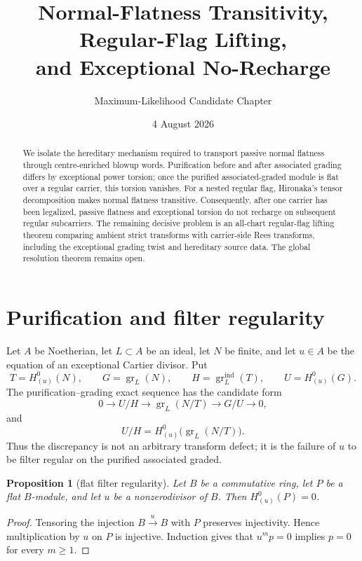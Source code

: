 \documentclass[11pt]{amsart}
\title{Normal-Flatness Transitivity, Regular-Flag Lifting,\\ and Exceptional No-Recharge}
\author{Maximum-Likelihood Candidate Chapter}
\date{4 August 2026}
\newtheorem{proposition}[theorem]{Proposition}
\begin{document}
\maketitle

\begin{abstract}
We isolate the hereditary mechanism required to transport passive normal
flatness through centre-enriched blowup words.  Purification before and after
associated grading differs by exceptional power torsion; once the purified
associated-graded module is flat over a regular carrier, this torsion vanishes.
For a nested regular flag, Hironaka's tensor decomposition makes normal
flatness transitive.  Consequently, after one carrier has been legalized,
passive flatness and exceptional torsion do not recharge on subsequent regular
subcarriers.  The remaining decisive problem is an all-chart regular-flag
lifting theorem comparing ambient strict transforms with carrier-side Rees
transforms, including the exceptional grading twist and hereditary source data.
The global resolution theorem remains open.
\end{abstract}

\section{Purification and filter regularity}
Let $A$ be Noetherian, let $L\subset A$ be an ideal, let $N$ be finite, and let
$u\in A$ be the equation of an exceptional Cartier divisor.  Put
\[
 T=H^0_{(u)}(N),\qquad
 G=\operatorname{gr}_L(N),\qquad
 H=\operatorname{gr}^{\mathrm{ind}}_L(T),\qquad
 U=H^0_{(u)}(G).
\]
The purification--grading exact sequence has the candidate form
\[
 0\longrightarrow U/H
 \longrightarrow \operatorname{gr}_L(N/T)
 \longrightarrow G/U\longrightarrow0,
\]
and
\[
 U/H=H^0_{(u)}\bigl(\operatorname{gr}_L(N/T)\bigr).
\]
Thus the discrepancy is not an arbitrary transform defect; it is the failure
of $u$ to be filter regular on the purified associated graded.

\begin{proposition}[flat filter regularity]
Let $B$ be a commutative ring, let $P$ be a flat $B$-module, and let $u$ be a
nonzerodivisor of $B$.  Then $H^0_{(u)}(P)=0$.
\end{proposition}

\begin{proof}
Tensoring the injection $B\xrightarrow{u}B$ with $P$ preserves injectivity.
Hence multiplication by $u$ on $P$ is injective.  Induction gives that
$u^m p=0$ implies $p=0$ for every $m\geq1$.
\end{proof}
\end{document}
